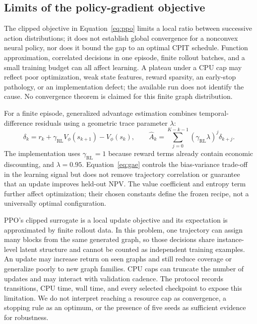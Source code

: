 \documentclass[11pt]{article}
\begin{document}
\subsection{Limits of the policy-gradient objective}
The clipped objective in Equation~\ref{eq:ppo} limits a local ratio between successive action distributions; it does not establish global convergence for a nonconvex neural policy, nor does it bound the gap to an optimal CPIT schedule. Function approximation, correlated decisions in one episode, finite rollout batches, and a small training budget can all affect learning. A plateau under a CPU cap may reflect poor optimization, weak state features, reward sparsity, an early-stop pathology, or an implementation defect; the available run does not identify the cause. No convergence theorem is claimed for this finite graph distribution.

For a finite episode, generalized advantage estimation combines temporal-difference residuals using a geometric trace parameter $\lambda$:
\begin{equation}
\delta_k=r_k+\gamma_{\mathrm{RL}}V_\phi(s_{k+1})-V_\phi(s_k),\qquad
\hat A_k=\sum_{j=0}^{K-k-1}(\gamma_{\mathrm{RL}}\lambda)^j\delta_{k+j}.
\label{eq:gae}
\end{equation}
The implementation uses $\gamma_{\mathrm{RL}}=1$ because reward terms already contain economic discounting, and $\lambda=0.95$. Equation~\ref{eq:gae} controls the bias-variance trade-off in the learning signal but does not remove trajectory correlation or guarantee that an update improves held-out NPV. The value coefficient and entropy term further affect optimization; their chosen constants define the frozen recipe, not a universally optimal configuration.

PPO's clipped surrogate is a local update objective and its expectation is approximated by finite rollout data. In this problem, one trajectory can assign many blocks from the same generated graph, so those decisions share instance-level latent structure and cannot be counted as independent training examples. An update may increase return on seen graphs and still reduce coverage or generalize poorly to new graph families. CPU caps can truncate the number of updates and may interact with validation cadence. The protocol records transitions, CPU time, wall time, and every selected checkpoint to expose this limitation. We do not interpret reaching a resource cap as convergence, a stopping rule as an optimum, or the presence of five seeds as sufficient evidence for robustness.
\end{document}
